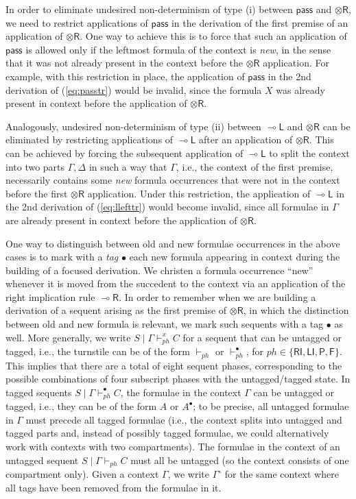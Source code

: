 \documentclass[copyright,creativecommons]{eptcs}
\theoremstyle{definition}
\newcommand{\tr}{\otimes \mathsf{R}}
\newcommand{\lright}{{\multimap}\mathsf{R}}
\newcommand{\lleft}{{\multimap}\mathsf{L}}
\newcommand{\pass}{\mathsf{pass}}
\newcommand{\RI}{\mathsf{RI}}
\newcommand{\LI}{\mathsf{LI}}
\newcommand{\Pass}{\mathsf{P}}
\newcommand{\F}{\mathsf{F}}
\newcommand{\xvdash}{\vdash^{x}}
\begin{document}
In order to eliminate undesired non-determinism of type (i) between $\pass$ and $\tr$, we need to restrict applications of $\pass$ in the derivation of the first premise of an application of $\tr$.
One way to achieve this is to force that such an application of $\pass$ is allowed only if the leftmost formula of the context is \emph{new}, in the sense that it was not already present in the context before the $\tr$ application. For example, with this restriction in place, the application of $\pass$ in the 2nd derivation of (\ref{eq:passtr}) would be invalid, since the formula $X$ was already present in context before the application of $\tr$.

Analogously, undesired non-determinism of type (ii) between $\lleft$ and $\tr$ can be eliminated by restricting applications of $\lleft$ after an application of $\tr$. This can be achieved by forcing the subsequent application of $\lleft$ to split the context into two parts $\Gamma,\Delta$ in such a way that $\Gamma$, i.e., the context of the first premise, necessarily contains some \emph{new} formula occurrences that were not in the context before the first $\tr$ application. Under this restriction, the application of $\lleft$ in the 2nd derivation of (\ref{eq:llefttr}) would become invalid, since all formulae in $\Gamma$ are already present in context before the application of $\tr$.

One way to distinguish between old and new formulae occurrences in the above cases is to mark with a \emph{tag} $\bullet$ each new formula appearing in context during the building of a focused derivation. We christen a formula occurrence ``new'' whenever it is moved from the succedent to the context via an application of the right implication rule $\lright$. In order to remember when we are building a derivation of a sequent arising as the first premise of $\tr$, in which the distinction between old and new formula is relevant, we mark such sequents with a tag $\bullet$ as well.
More generally, we write $S \mid \Gamma \xvdash_{ph} C$ for a sequent that can be untagged or tagged, i.e., the turnstile can be of the form $\vdash_{ph}$ or $\vdash^\bullet_{ph}$, for $ph \in \{ \RI,\LI,\Pass,\F\}$. This implies that there are a total of eight sequent phases, corresponding to the possible combinations of four subscript phases with the untagged/tagged state.
In tagged sequents  $S \mid \Gamma \vdash_{ph}^{\bullet} C$, the formulae in the context $\Gamma$ can be untagged or tagged, i.e., they can be of the form $A$ or $A^\bullet$; to be precise, all untagged formulae in $\Gamma$ must precede all tagged formulae (i.e., the context splits into untagged and tagged parts and, instead of possibly tagged formulae, we could alternatively work with contexts with two compartments). The formulae in the context of an untagged sequent $S \mid \Gamma \vdash_{ph} C$ must all be untagged (so the context consists of one compartment only). Given a context $\Gamma$, we write $\Gamma^{\circ}$ for the same context where all tags have been removed from the formulae in it.
\end{document}
